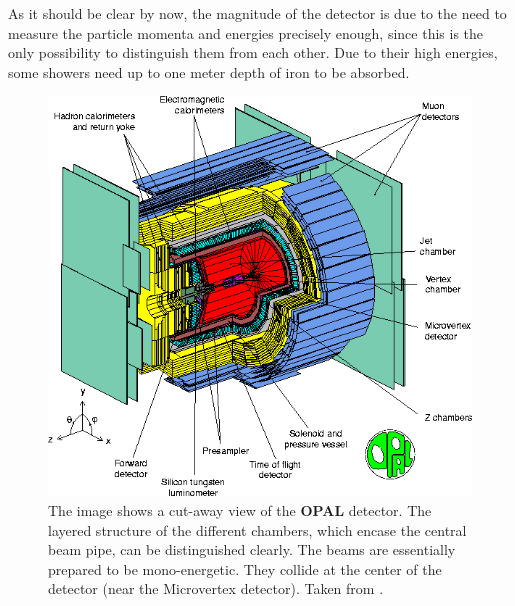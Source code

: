 As it should be clear by now, the magnitude of the detector is due to the need to measure the particle momenta and energies
precisely enough, since this is the only possibility to distinguish them from each other. 
Due to their high energies, some showers need up to one meter depth of iron to be absorbed. 
\begin{figure}[htpb]
    \centering
    \includegraphics[width=1.0\linewidth]{figures/opal}
    \caption{The image shows a cut-away view of the \textbf{OPAL} detector. The layered structure of the
    different chambers, which encase the central beam pipe, can be distinguished clearly. The beams are essentially
    prepared to be mono-energetic. They collide at the center of the detector (near the Microvertex detector).
    Taken from \cite{CERN_OPAL}.}
    \label{fig:opal1}
\end{figure}

